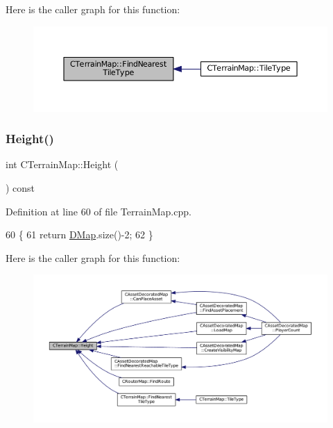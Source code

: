 Here is the caller graph for this function\+:
\nopagebreak
\begin{figure}[H]
\begin{center}
\leavevmode
\includegraphics[width=350pt]{classCTerrainMap_af32811cace3a3b01c9519b304ddb8efc_icgraph}
\end{center}
\end{figure}
\hypertarget{classCTerrainMap_ae5e4bf6507e0e3e9ac0322b43eed8a7a}{}\label{classCTerrainMap_ae5e4bf6507e0e3e9ac0322b43eed8a7a} 
\subsubsection{\texorpdfstring{Height()}{Height()}}
{\footnotesize\ttfamily int C\+Terrain\+Map\+::\+Height (\begin{DoxyParamCaption}{ }\end{DoxyParamCaption}) const}



Definition at line 60 of file Terrain\+Map.\+cpp.


\begin{DoxyCode}
60                              \{
61     \textcolor{keywordflow}{return} \hyperlink{classCTerrainMap_a80d154ce478948b10473534a7bca13f6}{DMap}.size()-2;
62 \}
\end{DoxyCode}
Here is the caller graph for this function\+:
\nopagebreak
\begin{figure}[H]
\begin{center}
\leavevmode
\includegraphics[width=350pt]{classCTerrainMap_ae5e4bf6507e0e3e9ac0322b43eed8a7a_icgraph}
\end{center}
\end{figure}
\hypertarget{classCTerrainMap_a620258ecf38afb6275c865dad4fc4af4}{}\label{classCTerrainMap_a620258ecf38afb6275c865dad4fc4af4} 

